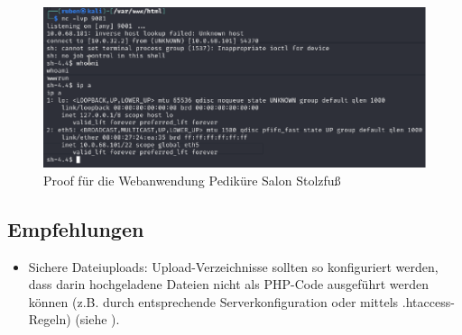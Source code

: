 \begin{figure}[!ht]
    \centering
    \includegraphics[width=\linewidth]{images/proofs/01_pedikuere_salon_proof.png}
    \caption{Proof für die Webanwendung Pediküre Salon Stolzfuß}
    \label{fig:01_pedikuere_salon_proof}
\end{figure}


\subsection*{Empfehlungen}
\begin{itemize}
    \item Sichere Dateiuploads: Upload-Verzeichnisse sollten so konfiguriert werden, dass darin hochgeladene Dateien nicht als PHP-Code ausgeführt werden können (z.B. durch entsprechende Serverkonfiguration oder mittels .htaccess-Regeln) (siehe \cite{owaspFileUpload}).
\end{itemize}













